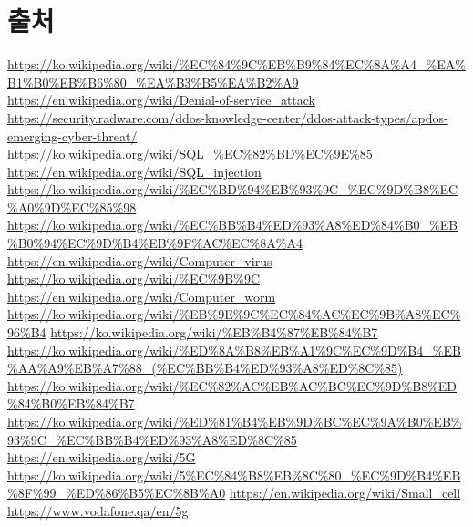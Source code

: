 \documentclass{oblivoir}
\begin{document}
\section{출처}
\url{https://ko.wikipedia.org/wiki/%EC%84%9C%EB%B9%84%EC%8A%A4_%EA%B1%B0%EB%B6%80_%EA%B3%B5%EA%B2%A9 } 
\newline
\url{https://en.wikipedia.org/wiki/Denial-of-service_attack}
\newline
\url{https://security.radware.com/ddos-knowledge-center/ddos-attack-types/apdos-emerging-cyber-threat/}
\newline
\url{https://ko.wikipedia.org/wiki/SQL_%EC%82%BD%EC%9E%85}
\newline
\url{https://en.wikipedia.org/wiki/SQL_injection}
\newline
\url{https://ko.wikipedia.org/wiki/%EC%BD%94%EB%93%9C_%EC%9D%B8%EC%A0%9D%EC%85%98}
\newline
\url{https://ko.wikipedia.org/wiki/%EC%BB%B4%ED%93%A8%ED%84%B0_%EB%B0%94%EC%9D%B4%EB%9F%AC%EC%8A%A4}
\newline
\url{https://en.wikipedia.org/wiki/Computer_virus}
\newline
\url{https://ko.wikipedia.org/wiki/%EC%9B%9C}
\newline
\url{https://en.wikipedia.org/wiki/Computer_worm}
\newline
\url{https://ko.wikipedia.org/wiki/%EB%9E%9C%EC%84%AC%EC%9B%A8%EC%96%B4}
\newline
\url{https://ko.wikipedia.org/wiki/%EB%B4%87%EB%84%B7}
\newline
\url{https://ko.wikipedia.org/wiki/%ED%8A%B8%EB%A1%9C%EC%9D%B4_%EB%AA%A9%EB%A7%88_(%EC%BB%B4%ED%93%A8%ED%8C%85)}
\newline
\url{https://ko.wikipedia.org/wiki/%EC%82%AC%EB%AC%BC%EC%9D%B8%ED%84%B0%EB%84%B7}
\newline
\url{https://ko.wikipedia.org/wiki/%ED%81%B4%EB%9D%BC%EC%9A%B0%EB%93%9C_%EC%BB%B4%ED%93%A8%ED%8C%85}
\newline
\url{https://en.wikipedia.org/wiki/5G}
\newline
\url{https://ko.wikipedia.org/wiki/5%EC%84%B8%EB%8C%80_%EC%9D%B4%EB%8F%99_%ED%86%B5%EC%8B%A0}
\newline
\url{https://en.wikipedia.org/wiki/Small_cell}
\newline
\url{https://www.vodafone.qa/en/5g}
\end{document}
